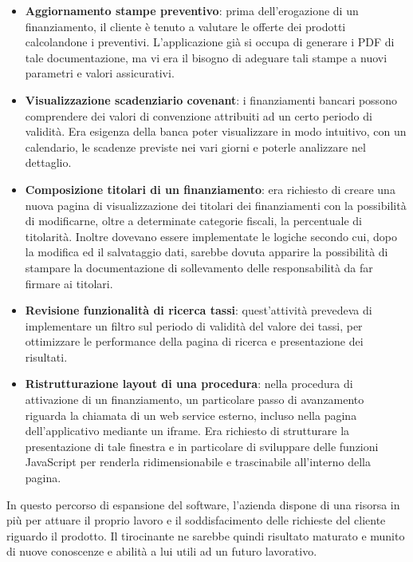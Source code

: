 	\begin{itemize}
		\item \textbf{Aggiornamento stampe preventivo}: prima dell'erogazione di un finanziamento, il cliente è tenuto a valutare le offerte dei prodotti calcolandone i preventivi. L'applicazione già si occupa di generare i PDF di tale documentazione, ma vi era il bisogno di adeguare tali stampe a nuovi parametri e valori assicurativi.
		\item \textbf{Visualizzazione scadenziario covenant\glossario}: i finanziamenti bancari possono comprendere dei valori di convenzione attribuiti ad un certo periodo di validità. Era esigenza della banca poter visualizzare in modo intuitivo, con un calendario, le scadenze previste nei vari giorni e poterle analizzare nel dettaglio.	
		\item \textbf{Composizione titolari di un finanziamento}: era richiesto di creare una nuova pagina di visualizzazione dei titolari dei finanziamenti con la possibilità di modificarne, oltre a determinate categorie fiscali, la percentuale di titolarità. Inoltre dovevano essere implementate le logiche secondo cui, dopo la modifica ed il salvataggio dati, sarebbe dovuta apparire la possibilità di stampare la documentazione di sollevamento delle responsabilità da far firmare ai titolari.
		\item \textbf{Revisione funzionalità di ricerca tassi}: quest'attività prevedeva di implementare un filtro sul periodo di validità del valore dei tassi, per ottimizzare le performance della pagina di ricerca e presentazione dei risultati.
		\item \textbf{Ristrutturazione layout di una procedura}: nella procedura di attivazione di un finanziamento, un particolare passo di avanzamento riguarda la chiamata di un web service esterno, incluso nella pagina dell'applicativo mediante un iframe\glossario . Era richiesto di strutturare la presentazione di tale finestra e in particolare di sviluppare delle funzioni JavaScript per renderla ridimensionabile e trascinabile all'interno della pagina.
	\end{itemize}
	
	In questo percorso di espansione del software, l'azienda dispone di una risorsa in più per attuare il proprio lavoro e il soddisfacimento delle richieste del cliente riguardo il prodotto. Il tirocinante ne sarebbe quindi risultato maturato e munito di nuove conoscenze e abilità a lui utili ad un futuro lavorativo.\\
	
